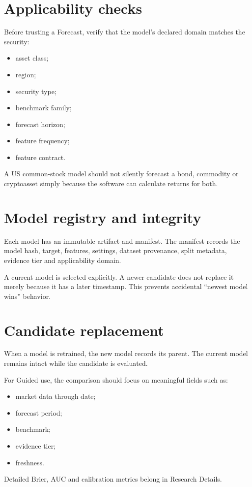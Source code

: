 \documentclass[11pt]{article}
\begin{document}
\section{Applicability checks}
Before trusting a Forecast, verify that the model's declared domain matches the security:
\begin{itemize}[itemsep=0.15em]
\item asset class;
\item region;
\item security type;
\item benchmark family;
\item forecast horizon;
\item feature frequency;
\item feature contract.
\end{itemize}

A US common-stock model should not silently forecast a bond, commodity or cryptoasset simply because the software can calculate returns for both.

\section{Model registry and integrity}
Each model has an immutable artifact and manifest. The manifest records the model hash, target, features, settings, dataset provenance, split metadata, evidence tier and applicability domain.

A current model is selected explicitly. A newer candidate does not replace it merely because it has a later timestamp. This prevents accidental ``newest model wins'' behavior.

\section{Candidate replacement}
When a model is retrained, the new model records its parent. The current model remains intact while the candidate is evaluated.

For Guided use, the comparison should focus on meaningful fields such as:
\begin{itemize}[itemsep=0.15em]
\item market data through date;
\item forecast period;
\item benchmark;
\item evidence tier;
\item freshness.
\end{itemize}
Detailed Brier, AUC and calibration metrics belong in Research Details.
\end{document}
